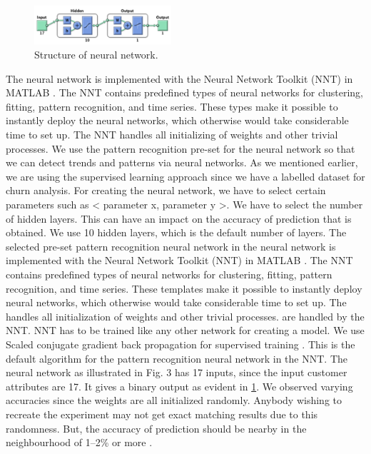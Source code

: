 \begin{itemize}
\begin{figure}[h!]
	\end{figure}
	\begin{figure}[h!]
		\centering	
		\includegraphics[width=2.0in]{3.png} %
		\caption{ Structure of neural network.}
		\label{fig:3} %
		
	\end{figure}
	
	The neural network is implemented with the Neural
	Network Toolkit (NNT) \cite{citation-11} in MATLAB \cite{citation-10}. The NNT
	contains predefined types of neural networks for clustering,
	fitting, pattern recognition, and time series. These types make
	it possible to instantly deploy the neural networks, which
	otherwise would take considerable time to set up. The NNT
	handles all initializing of weights and other trivial processes.
	We use the pattern recognition pre-set for the neural network
	so that we can detect trends and patterns via neural networks.
	As we mentioned earlier, we are using the supervised
	learning approach since we have a labelled dataset for churn
	analysis. For creating the neural network, we have to select
	certain parameters such as \textless{} parameter x, parameter y \textgreater{}. We
	have to select the number of hidden layers. This can have an
	impact on the accuracy of prediction that is obtained. We use
	10 hidden layers, which is the default number of layers.
	The selected pre-set pattern recognition neural network in
	the neural network is implemented with the Neural Network
	Toolkit (NNT) \cite{citation-11} in MATLAB \cite{citation-10}. The NNT contains
	predefined types of neural networks for clustering, fitting,
	pattern recognition, and time series. These templates make it
	possible to instantly deploy neural networks, which otherwise
	would take considerable time to set up. The \cite{citation-11} handles all
	initialization of weights and other trivial processes. are handled
	by the NNT\cite{citation-11}.
	NNT\cite{citation-11} has to be trained like any other network for creating
	a model. We use Scaled conjugate gradient back propagation
	for supervised training \cite{citation-6}. This is the default algorithm for
	the pattern recognition neural network in the NNT. The neural
	network as illustrated in Fig. 3 has 17 inputs, since the input
	customer attributes are 17. It gives a binary output as evident
	in \ref{fig:3}.
	We observed varying accuracies since the weights are
	all initialized randomly. Anybody wishing to recreate the
	experiment may not get exact matching results due to this
	randomness. But, the accuracy of prediction should be nearby
	in the neighbourhood of 1–2\% or more
	\cite{citation-8}.
	

\end{itemize}
